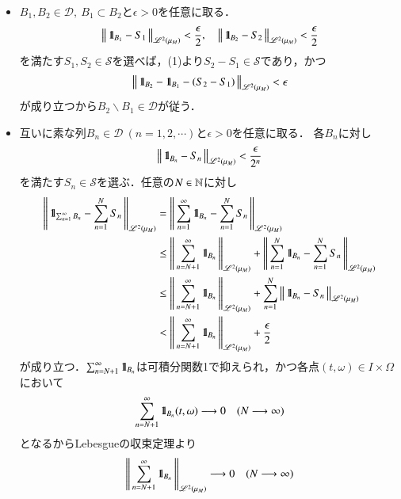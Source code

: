 \begin{prf}
\begin{description}
\begin{itemize}
					\item $B_1,B_2 \in \mathcal{D},\ B_1 \subset B_2$と$\epsilon > 0$を任意に取る．
						\begin{align}
							\left\|\, \mbox{1}\hspace{-0.25em}\mbox{l}_{B_1} - S_1\, \right\|_{\mathscr{L}^{2} \left(\mu_M\right)} < \frac{\epsilon}{2}, \quad
							\left\|\, \mbox{1}\hspace{-0.25em}\mbox{l}_{B_2} - S_2\, \right\|_{\mathscr{L}^{2} \left(\mu_M\right)} < \frac{\epsilon}{2}
						\end{align}
						を満たす$S_1,S_2 \in \mathcal{S}$を選べば，(1)より$S_2 - S_1 \in \mathcal{S}$であり，かつ
						\begin{align}
							\left\|\, \mbox{1}\hspace{-0.25em}\mbox{l}_{B_2} - \mbox{1}\hspace{-0.25em}\mbox{l}_{B_1} - \left(S_2 - S_1\right)\, \right\|_{\mathscr{L}^{2} \left(\mu_M\right)} < \epsilon
						\end{align}
						が成り立つから$B_2 \backslash B_1 \in \mathcal{D}$が従う．
						
					\item 互いに素な列$B_n \in \mathcal{D}\ (n=1,2,\cdots)$と$\epsilon > 0$を任意に取る．
						各$B_n$に対し
						\begin{align}
							\left\|\, \mbox{1}\hspace{-0.25em}\mbox{l}_{B_n} - S_n\, \right\|_{\mathscr{L}^{2} \left(\mu_M\right)} < \frac{\epsilon}{2^n}
						\end{align}
						を満たす$S_n \in \mathcal{S}$を選ぶ．任意の$N \in \mathbb{N}$に対し
						\begin{align}
							\left\|\, \mbox{1}\hspace{-0.25em}\mbox{l}_{\sum_{n=1}^{\infty}B_n} - \sum_{n=1}^{N}S_n\, \right\|_{\mathscr{L}^{2} \left(\mu_M\right)}
							&= \left\|\, \sum_{n=1}^{\infty}\mbox{1}\hspace{-0.25em}\mbox{l}_{B_n} - \sum_{n=1}^{N}S_n\, \right\|_{\mathscr{L}^{2} \left(\mu_M\right)} \\
							&\leq \left\|\, \sum_{n=N+1}^{\infty}\mbox{1}\hspace{-0.25em}\mbox{l}_{B_n}\, \right\|_{\mathscr{L}^{2} \left(\mu_M\right)} + \left\|\, \sum_{n=1}^{N}\mbox{1}\hspace{-0.25em}\mbox{l}_{B_n} - \sum_{n=1}^{N}S_n\, \right\|_{\mathscr{L}^{2} \left(\mu_M\right)} \\
							&\leq \left\|\, \sum_{n=N+1}^{\infty}\mbox{1}\hspace{-0.25em}\mbox{l}_{B_n}\, \right\|_{\mathscr{L}^{2} \left(\mu_M\right)} + \sum_{n=1}^{N} \left\|\, \mbox{1}\hspace{-0.25em}\mbox{l}_{B_n} - S_n\, \right\|_{\mathscr{L}^{2} \left(\mu_M\right)} \\
							&< \left\|\, \sum_{n=N+1}^{\infty}\mbox{1}\hspace{-0.25em}\mbox{l}_{B_n}\, \right\|_{\mathscr{L}^{2} \left(\mu_M\right)} + \frac{\epsilon}{2}
						\end{align}
						が成り立つ．$\sum_{n=N+1}^{\infty}\mbox{1}\hspace{-0.25em}\mbox{l}_{B_n}$は可積分関数1で抑えられ，かつ各点$(t,\omega) \in I \times \Omega$において
						\begin{align}
							\sum_{n=N+1}^{\infty}\mbox{1}\hspace{-0.25em}\mbox{l}_{B_n}(t,\omega) \longrightarrow 0
							\quad (N \longrightarrow \infty)
						\end{align}
						となるからLebesgueの収束定理より
						\begin{align}
							\Norm{\sum_{n=N+1}^{\infty}\defunc_{B_n}}{\semiLp{2}{\mu_M}} \longrightarrow 0
							\quad (N \longrightarrow \infty)

\end{align}
\end{itemize}
\end{description}
\end{prf}
